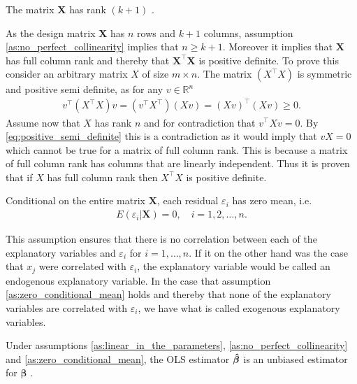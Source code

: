 \begin{assumption}\label{as:no_perfect_collinearity}
    The matrix $\mathbf{X}$ has rank $(k + 1)$ \cite[p. 810]{Wooldridge2012}.
\end{assumption}
As the design matrix $\mathbf{X}$ has $n$ rows and $k + 1$ columns, assumption \ref{as:no_perfect_collinearity} implies that $n \geq k + 1$.
Moreover it implies that $\mathbf{X}$ has full column rank and thereby that $\mathbf{X}^\top\mathbf{X}$ is positive definite.
To prove this consider an arbitrary matrix $X$ of size $m \times n$.
The matrix $(X^\top X)$ is symmetric and positive semi definite, as for any $v \in \mathbb{R}^n$
\begin{align}\label{eq:positive_semi_definite}
v^\top (X^\top X) v = (v^\top X^\top) (X v) = (X v)^\top (X v) \geq 0.
\end{align}
Assume now that $X$ has rank $n$ and for contradiction that $v^\top X v = 0$.
By \eqref{eq:positive_semi_definite} this is a contradiction as it would imply that $vX = 0$ which cannot be true for a matrix of full column rank.
This is because a matrix of full column rank has columns that are linearly independent.
Thus it is proven that if $X$ has full column rank then $X^\top X$ is positive definite.
\begin{assumption}\label{as:zero_conditional_mean}
    Conditional on the entire matrix $\mathbf{X}$, each residual $\varepsilon_i$ has zero mean, i.e. \cite[p. 810]{Wooldridge2012}
    \begin{align*}
        E(\varepsilon_i | \mathbf{X}) = 0, \quad i = 1, 2, \ldots, n.
    \end{align*}
\end{assumption}
This assumption ensures that there is no correlation between each of the explanatory variables and $\varepsilon_i$ for $i = 1, \ldots, n$.
If it on the other hand was the case that $x_j$ were correlated with $\varepsilon_i$, the explanatory variable would be called an endogenous explanatory variable.
In the case that assumption \ref{as:zero_conditional_mean} holds and thereby that none of the explanatory variables are correlated with $\varepsilon_i$, we have what is called exogenous explanatory variables.
\begin{theorem}\label{th:unbiasedness_of_ols}
    Under assumptions \ref{as:linear_in_the_parameters}, \ref{as:no_perfect_collinearity} and \ref{as:zero_conditional_mean}, the OLS estimator $\operatorname{\boldsymbol{\hat{\beta}}}$ is an unbiased estimator for $\boldsymbol{\beta}$ \cite[p. 810]{Wooldridge2012}.
\end{theorem}
